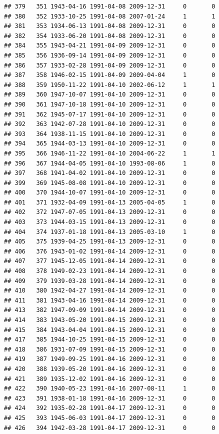 \documentclass[
]{book}
\begin{document}
\begin{verbatim}
## 379   351 1943-04-16 1991-04-08 2009-12-31     0       0
## 380   352 1933-10-25 1991-04-08 2007-01-24     1       1
## 381   353 1934-06-13 1991-04-08 2009-12-31     0       0
## 382   354 1933-06-20 1991-04-08 2009-12-31     0       0
## 384   355 1943-04-21 1991-04-09 2009-12-31     0       0
## 385   356 1936-09-14 1991-04-09 2009-12-31     0       0
## 386   357 1933-02-28 1991-04-09 2009-12-31     0       0
## 387   358 1946-02-15 1991-04-09 2009-04-04     1       0
## 388   359 1950-11-22 1991-04-10 2002-06-12     1       1
## 389   360 1947-10-07 1991-04-10 2009-12-31     0       0
## 390   361 1947-10-18 1991-04-10 2009-12-31     0       0
## 391   362 1945-07-17 1991-04-10 2009-12-31     0       0
## 392   363 1942-07-28 1991-04-10 2009-12-31     0       0
## 393   364 1938-11-15 1991-04-10 2009-12-31     0       0
## 394   365 1944-03-13 1991-04-10 2009-12-31     0       0
## 395   366 1946-11-22 1991-04-10 2004-06-22     1       1
## 396   367 1944-04-05 1991-04-10 1993-08-06     1       0
## 397   368 1941-04-02 1991-04-10 2009-12-31     0       0
## 399   369 1945-08-08 1991-04-10 2009-12-31     0       0
## 400   370 1944-10-07 1991-04-10 2009-12-31     0       0
## 401   371 1932-04-09 1991-04-13 2005-04-05     1       0
## 402   372 1947-07-05 1991-04-13 2009-12-31     0       0
## 403   373 1944-03-15 1991-04-13 2009-12-31     0       0
## 404   374 1937-01-18 1991-04-13 2005-03-10     1       0
## 405   375 1939-04-25 1991-04-13 2009-12-31     0       0
## 406   376 1943-01-02 1991-04-14 2009-12-31     0       0
## 407   377 1945-12-05 1991-04-14 2009-12-31     0       0
## 408   378 1949-02-23 1991-04-14 2009-12-31     0       0
## 409   379 1939-03-28 1991-04-14 2009-12-31     0       0
## 410   380 1942-04-27 1991-04-14 2009-12-31     0       0
## 411   381 1943-04-16 1991-04-14 2009-12-31     0       0
## 413   382 1947-09-09 1991-04-14 2009-12-31     0       0
## 414   383 1943-05-20 1991-04-15 2009-12-31     0       0
## 415   384 1943-04-04 1991-04-15 2009-12-31     0       0
## 417   385 1944-10-25 1991-04-15 2009-12-31     0       0
## 418   386 1931-07-09 1991-04-15 2009-12-31     0       0
## 419   387 1949-09-25 1991-04-16 2009-12-31     0       0
## 420   388 1939-05-20 1991-04-16 2009-12-31     0       0
## 421   389 1935-12-02 1991-04-16 2009-12-31     0       0
## 422   390 1940-05-23 1991-04-16 2007-08-11     1       0
## 423   391 1938-01-18 1991-04-16 2009-12-31     0       0
## 424   392 1935-02-28 1991-04-17 2009-12-31     0       0
## 425   393 1945-06-03 1991-04-17 2009-12-31     0       0
## 426   394 1942-03-28 1991-04-17 2009-12-31     0       0

\end{verbatim}
\end{document}

